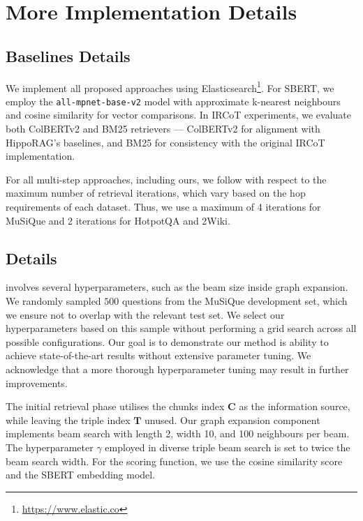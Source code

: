 \section{More Implementation Details}
\label{appendix:detailed_implementation_details}



\subsection{Baselines Details}
\label{appendix:retrievers_implementation_details}
We implement all proposed approaches using Elasticsearch\footnote{\url{https://www.elastic.co}}. For SBERT, we employ the \texttt{all-mpnet-base-v2} model with approximate k-nearest neighbours and cosine similarity for vector comparisons. In IRCoT experiments, we evaluate both ColBERTv2 and BM25 retrievers — ColBERTv2 for alignment with HippoRAG's baselines, and BM25 for consistency with the original IRCoT implementation.

For all multi-step approaches, including ours, we follow \citeauthor{Gutierrez2024} with respect to the maximum number of retrieval iterations, which vary based on the hop requirements of each dataset. Thus, we use a maximum of 4 iterations for MuSiQue and 2 iterations for HotpotQA and 2Wiki.

\subsection{\gear Details}
\gear involves several hyperparameters, such as the beam size inside graph expansion. 
We randomly sampled $500$ questions from the MuSiQue development set, which we ensure not to overlap with the relevant test set. We select our hyperparameters based on this sample without performing a grid search across all possible configurations. Our goal is to demonstrate our method is ability to achieve state-of-the-art results without extensive parameter tuning. We acknowledge that a more thorough hyperparameter tuning may result in further improvements.


The initial retrieval phase utilises the chunks index $\mathbf{C}$ as the information source, while leaving the triple index $\mathbf{T}$ unused. Our graph expansion component implements beam search with length 2, width 10, and 100 neighbours per beam. The hyperparameter $\gamma$ employed in diverse triple beam search is set to twice the beam search width. For the scoring function, we use the cosine similarity score and the SBERT embedding model.

